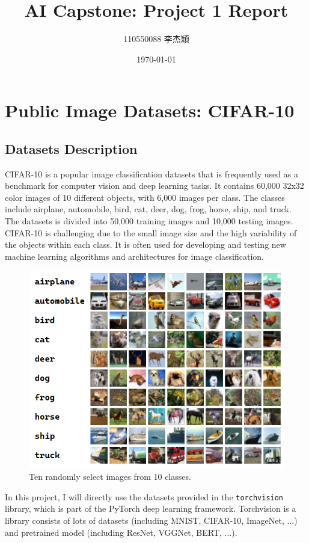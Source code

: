 \documentclass[twocolumn, draft]{extarticle}
\title{AI Capstone: Project 1 Report}
\author{110550088 李杰穎}
\date{\today}
\begin{document}
\maketitle

\section{Public Image Datasets: CIFAR-10}
\subsection{Datasets Description}

CIFAR-10 is a popular image classification datasets that is frequently used as a benchmark for computer vision and deep learning tasks. It contains 60,000 32x32 color images of 10 different objects, with 6,000 images per class. The classes include airplane, automobile, bird, cat, deer, dog, frog, horse, ship, and truck. The datasets is divided into 50,000 training images and 10,000 testing images. CIFAR-10 is challenging due to the small image size and the high variability of the objects within each class. It is often used for developing and testing new machine learning algorithms and architectures for image classification.

\begin{figure}[H]
\centering
\includegraphics[width=0.9\linewidth]{figure/cifar}
\caption{Ten randomly select images from 10 classes.}
\label{fig:cifar}
\end{figure}

In this project, I will directly use the datasets provided in the \texttt{torchvision} library, which is part of the PyTorch deep learning framework. Torchvision is a library consists of lots of datasets (including MNIST, CIFAR-10, ImageNet, ...) and pretrained model (including ResNet, VGGNet, BERT, ...).
\end{document}
